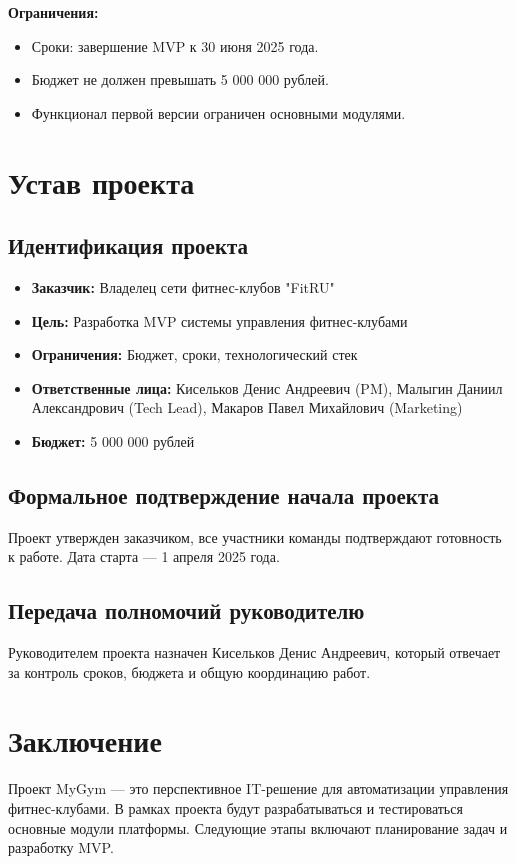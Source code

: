 \documentclass[14pt, russian]{matmex-diploma-custom}
\begin{document}
\textbf{Ограничения:}
\begin{itemize}
    \item Сроки: завершение MVP к 30 июня 2025 года.
    \item Бюджет не должен превышать 5 000 000 рублей.
    \item Функционал первой версии ограничен основными модулями.
\end{itemize}

\section{Устав проекта}
\subsection{Идентификация проекта}
\begin{itemize}
    \item \textbf{Заказчик:} Владелец сети фитнес-клубов "FitRU"
    \item \textbf{Цель:} Разработка MVP системы управления фитнес-клубами
    \item \textbf{Ограничения:} Бюджет, сроки, технологический стек
    \item \textbf{Ответственные лица:} Кисельков Денис Андреевич (PM), Малыгин Даниил Александрович (Tech Lead), Макаров Павел Михайлович (Marketing)
    \item \textbf{Бюджет:} 5 000 000 рублей
\end{itemize}

\subsection{Формальное подтверждение начала проекта}
Проект утвержден заказчиком, все участники команды подтверждают готовность к работе. Дата старта — 1 апреля 2025 года.

\subsection{Передача полномочий руководителю}
Руководителем проекта назначен Кисельков Денис Андреевич, который отвечает за контроль сроков, бюджета и общую координацию работ.

\section{Заключение}
Проект MyGym — это перспективное IT-решение для автоматизации управления фитнес-клубами. В рамках проекта будут разрабатываться и тестироваться основные модули платформы. Следующие этапы включают планирование задач и разработку MVP.
\end{document}
